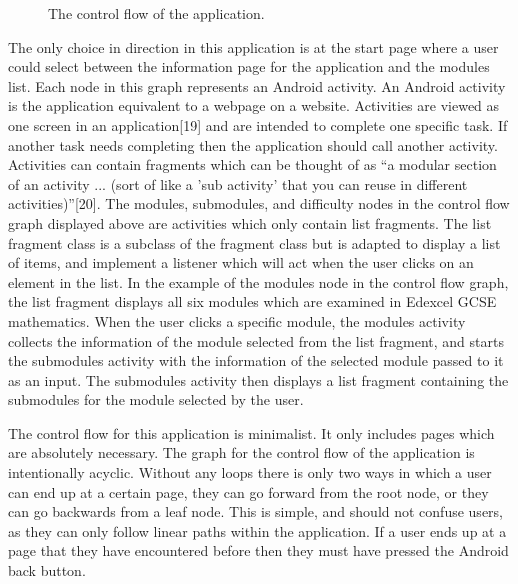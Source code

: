 \documentclass{article}
\begin{document}
\begin{figure}[H]
	\centering
	\caption{The control flow of the application.}
	\label{figure:applicationControlFlow}
\end{figure}

The only choice in direction in this application is at the start page where a user could select between the information page for the application and the modules list. Each node in this graph represents an Android activity. An Android activity is the application equivalent to a webpage on a website. Activities are viewed as one screen in an application[19] and are intended to complete one specific task. If another task needs completing then the application should call another activity. Activities can contain fragments which can be thought of as ``a modular section of an activity ... (sort of like a 'sub activity' that you can reuse in different activities)''[20]. The modules, submodules, and difficulty nodes in the control flow graph displayed above are activities which only contain list fragments. The list fragment class is a subclass of the fragment class but is adapted to display a list of items, and implement a listener which will act when the user clicks on an element in the list. In the example of the modules node in the control flow graph, the list fragment displays all six modules which are examined in Edexcel GCSE mathematics. When the user clicks a specific module, the modules activity collects the information of the module selected from the list fragment, and starts the submodules activity with the information of the selected module passed to it as an input. The submodules activity then displays a list fragment containing the submodules for the module selected by the user. \par

The control flow for this application is minimalist. It only includes pages which are absolutely necessary. The graph for the control flow of the application is intentionally acyclic. Without any loops there is only two ways in which a user can end up at a certain page, they can go forward from the root node, or they can go backwards from a leaf node. This is simple, and should not confuse users, as they can only follow linear paths within the application. If a user ends up at a page that they have encountered before then they must have pressed the Android back button. \par
\end{document}
